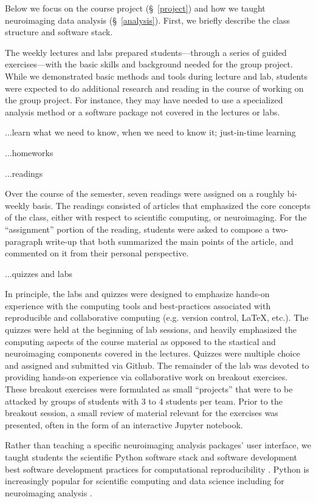 Below we focus on the course project (\S~\ref{project}) and
how we taught neuroimaging data analysis (\S~\ref{analysis}).
First, we briefly describe the class structure and software stack.

The weekly lectures and labs prepared students---through a
series of guided exercises---with the basic skills and
background needed for the group project.
While we demonstrated basic methods and tools during lecture and lab,
students were expected to do additional research and reading in the course
of working on the group project.
For instance, they may have needed to use a specialized analysis
method or a software package not covered in the lectures or labs.

...learn what we need to know, when we need to know it; just-in-time learning 

...homeworks

...readings

Over the course of the semester, seven readings were assigned on a roughly
bi-weekly basis.
The readings consisted of articles that emphasized the core concepts
of the class, either with respect to scientific computing, or neuroimaging.
For the ``assignment'' portion of the reading, students were asked to compose
a two-paragraph write-up that both summarized the main points of the article,
and commented on it from their personal perspective.

...quizzes and labs

In principle, the labs and quizzes were designed to emphasize hands-on 
experience with the computing tools and best-practices associated with
reproducible and collaborative computing (e.g. version control, \LaTeX, etc.).
The quizzes were held at the beginning of lab sessions, and heavily emphasized
the computing aspects of the course material as opposed to the stastical and
neuroimaging components covered in the lectures.
Quizzes were multiple choice and assigned and submitted via Github.
The remainder of the lab was devoted to providing hands-on experience via
collaborative work on breakout exercises.
These breakout exercises were formulated as small ``projects'' that were to be
attacked by groups of students with 3 to 4 students per team.
Prior to the breakout session, a small review of material relevant for the 
exercises was presented, often in the form of an interactive Jupyter notebook.

Rather than teaching a specific neuroimaging analysis packages' user interface,
we taught students the scientific Python software stack
\citep{millman2011python, perez2011python} and software development best
software development practices for computational reproducibility \citep{millman2014developing}.
Python is increasingly popular for scientific computing and data science
including for neuroimaging analysis \citep{millman2007analysis}.


